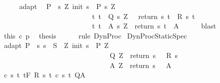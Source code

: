 \begin{isabellebody}
%
\isadelimproof
%
\endisadelimproof
%
\isatagproof
{}\isamarkupfalse%
\ {\isacharminus}\isanewline
\ \ \isamarkupfalse%
\ adapt\ \isamarkupfalse%
\ {\isachardoublequoteopen}P\ {\isasymsubseteq}\ {\isacharbraceleft}s{\isachardot}\ {\isasymexists}Z{\isachardot}\ init\ s\ {\isasymin}\ P{\isacharprime}\ s\ Z\ {\isasymand}\isanewline
\ \ \ \ \ \ \ \ \ \ \ \ \ \ \ \ \ \ \ \ \ \ \ \ \ \ {\isacharparenleft}{\isasymforall}t{\isachardot}\ t\ {\isasymin}\ Q{\isacharprime}\ s\ Z\ {\isasymlongrightarrow}\ \ return\ s\ t\ {\isasymin}\ R\ s\ t{\isacharparenright}\ {\isasymand}\isanewline
\ \ \ \ \ \ \ \ \ \ \ \ \ \ \ \ \ \ \ \ \ \ \ \ \ \ {\isacharparenleft}{\isasymforall}t{\isachardot}\ t\ {\isasymin}\ A{\isacharprime}\ s\ Z\ {\isasymlongrightarrow}\ return\ s\ t\ {\isasymin}\ A{\isacharparenright}{\isacharbraceright}{\isachardoublequoteclose}\isanewline
\ \ \ \ \isamarkupfalse%
\ blast\isanewline
\ \ \isamarkupfalse%
\ this\ c\ p\ \isamarkupfalse%
\ {\isacharquery}thesis\isanewline
\ \ \ \ \isamarkupfalse%
\ {\isacharparenleft}rule\ DynProc{\isacharparenright}\isanewline
{}\isamarkupfalse%
%
\endisatagproof
{\isafoldproof}%
%
\isadelimproof
\isanewline
%
\endisadelimproof
\isanewline
{}\isamarkupfalse%
\ DynProcStaticSpec{\isacharcolon}\ \isanewline
{}\ adapt{\isacharcolon}\ {\isachardoublequoteopen}P\ {\isasymsubseteq}\ {\isacharbraceleft}s{\isachardot}\ s\ {\isasymin}\ S\ {\isasymand}\ {\isacharparenleft}{\isasymexists}Z{\isachardot}\ init\ s\ {\isasymin}\ P{\isacharprime}\ Z\ \ {\isasymand}\ \isanewline
\ \ \ \ \ \ \ \ \ \ \ \ \ \ \ \ \ \ \ \ \ \ \ \ \ \ \ \ {\isacharparenleft}{\isasymforall}{\isasymtau}{\isachardot}\ {\isasymtau}\ {\isasymin}\ Q{\isacharprime}\ Z\ {\isasymlongrightarrow}\ return\ s\ {\isasymtau}\ {\isasymin}\ R\ s\ {\isasymtau}{\isacharparenright}\ {\isasymand}\isanewline
\ \ \ \ \ \ \ \ \ \ \ \ \ \ \ \ \ \ \ \ \ \ \ \ \ \ \ \ {\isacharparenleft}{\isasymforall}{\isasymtau}{\isachardot}\ {\isasymtau}\ {\isasymin}\ A{\isacharprime}\ Z\ {\isasymlongrightarrow}\ return\ s\ {\isasymtau}\ {\isasymin}\ A{\isacharparenright}{\isacharparenright}{\isacharbraceright}{\isachardoublequoteclose}\isanewline
{}\ c{\isacharcolon}\ {\isachardoublequoteopen}{\isasymforall}s\ t{\isachardot}\ {\isasymGamma}{\isacharcomma}{\isasymTheta}{\isasymturnstile}\isactrlsub t\isactrlbsub {\isacharslash}F\isactrlesub \ {\isacharparenleft}R\ s\ t{\isacharparenright}\ {\isacharparenleft}c\ s\ t{\isacharparenright}\ Q{\isacharcomma}A{\isachardoublequoteclose}\isanewline

\end{isabellebody}
